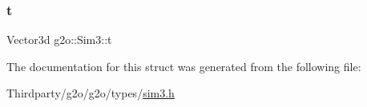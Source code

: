 \mbox{\label{structg2o_1_1_sim3_a3ef879fb13b88732428bd2f2a558d11c}} 
\subsubsection{\texorpdfstring{t}{t}}
{\footnotesize\ttfamily Vector3d g2o\+::\+Sim3\+::t\hspace{0.3cm}{\ttfamily [protected]}}



The documentation for this struct was generated from the following file\+:\begin{DoxyCompactItemize}
\item 
Thirdparty/g2o/g2o/types/\mbox{\hyperlink{sim3_8h}{sim3.\+h}}\end{DoxyCompactItemize}

